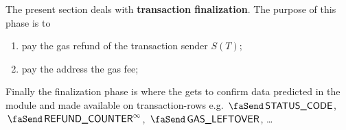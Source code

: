 The present section deals with \textbf{transaction finalization}.
The purpose of this phase is to
\begin{enumerate}
	\item pay the gas refund of the transaction sender $S(T)$;
	\item pay the  address the gas fee;
\end{enumerate}
Finally the finalization phase is where the \hubMod{} gets to confirm data predicted in the \txnDataMod{} module and made available on transaction-rows e.g.
$\txStatusCode$,
$\txFinalRefundCounter$,
$\txLeftoverGas$,
\dots{}
